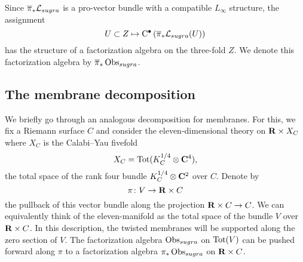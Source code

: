 \documentclass[11pt]{amsart}
\begin{document}
\parsec[s:mainfact]

Since $\overline{\pi}_* \mathcal L_{sugra}$ is a pro-vector bundle with a compatible $L_\infty$ structure, the assignment 
\[
U\subset Z \mapsto {\rm C}^\bullet\left(\overline{\pi}_* \mathcal L_{sugra}(U)\right) 
\]
has the structure of a factorization algebra on the three-fold $Z$. 
We denote this factorization algebra by $\overline{\pi}_* \operatorname{Obs}_{sugra}$. 




\subsection{The membrane decomposition}

We briefly go through an analogous decomposition for membranes. 
For this, we fix a Riemann surface $C$ and consider the eleven-dimensional theory on $\mathbf{R} \times X_C$ where $X_C$ is the Calabi--Yau fivefold
\[
X_C = \text{Tot}(K_C^{1/4} \otimes \mathbf{C}^4),
\]
the total space of the rank four bundle $K_C^{1/4} \otimes \mathbf{C}^2$ over $C$.
Denote by 
\[
\pi \colon V \to \mathbf{R} \times C
\] 
the pullback of this vector bundle along the projection $\mathbf{R} \times C \to C$.
We can equivalently think of the eleven-manifold as the total space of the bundle $V$ over $\mathbf{R} \times C$. 
In this description, the twisted membranes will be supported along the zero section of $V$. 
The factorization algebra $\operatorname{Obs}_{sugra}$ on ${\rm Tot}(V)$ can be pushed forward along $\pi$ to a factorization algebra $\pi_* \operatorname{Obs}_{sugra}$ on $\mathbf{R} \times C$. 
\end{document}
